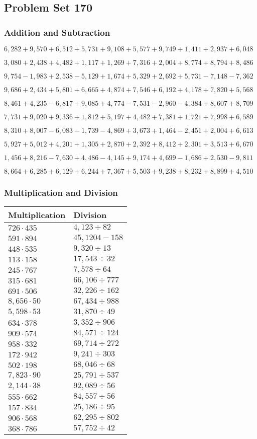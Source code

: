 \hypertarget{problem-set-170}{%
\subsection{Problem Set 170}\label{problem-set-170}}

\hypertarget{addition-and-subtraction}{%
\subsubsection{Addition and
Subtraction}\label{addition-and-subtraction}}

\(6,282+9,570+6,512+5,731+9,108+5,577+9,749+1,411+2,937+6,048\)

\(3,080+2,438+4,482+1,117+1,269+7,316+2,004+8,774+8,794+8,486\)

\(9,754-1,983+2,538-5,129+1,674+5,329+2,692+5,731-7,148-7,362\)

\(9,686+2,434+5,801+6,665+4,874+7,546+6,192+4,178+7,820+5,568\)

\(8,461+4,235-6,817+9,085+4,774-7,531-2,960-4,384+8,607+8,709\)

\(7,731+9,020+9,336+1,812+5,197+4,482+7,381+1,721+7,998+6,589\)

\(8,310+8,007-6,083-1,739-4,869+3,673+1,464-2,451+2,004+6,613\)

\(5,927+5,012+4,201+1,305+2,870+2,392+8,412+2,301+3,513+6,670\)

\(1,456+8,216-7,630+4,486-4,145+9,174+4,699-1,686+2,530-9,811\)

\(8,664+6,285+6,129+6,244+7,367+5,503+9,238+8,232+8,899+4,510\)

\hypertarget{multiplication-and-division}{%
\subsubsection{Multiplication and
Division}\label{multiplication-and-division}}

\begin{longtable}[]{@{}ll@{}}
\toprule
Multiplication & Division\tabularnewline
\midrule
\endhead
\(726\cdot435\) & \(4,123÷82\)\tabularnewline
\(591\cdot894\) & \(45,120 4-158\)\tabularnewline
\(448\cdot535\) & \(9,320÷13\)\tabularnewline
\(113\cdot158\) & \(17,543÷32\)\tabularnewline
\(245\cdot767\) & \(7,578÷64\)\tabularnewline
\(315\cdot681\) & \(66,106÷777\)\tabularnewline
\(691\cdot506\) & \(32,226÷162\)\tabularnewline
\(8,656\cdot50\) & \(67,434÷988\)\tabularnewline
\(5,598\cdot53\) & \(31,870÷49\)\tabularnewline
\(634\cdot378\) & \(3,352÷906\)\tabularnewline
\(909\cdot574\) & \(84,571÷124\)\tabularnewline
\(958\cdot332\) & \(69,714÷272\)\tabularnewline
\(172\cdot942\) & \(9,241÷303\)\tabularnewline
\(502\cdot198\) & \(68,046÷68\)\tabularnewline
\(7,823\cdot90\) & \(25,791÷537\)\tabularnewline
\(2,144\cdot38\) & \(92,089÷56\)\tabularnewline
\(555\cdot662\) & \(84,557÷56\)\tabularnewline
\(157\cdot834\) & \(25,186÷95\)\tabularnewline
\(906\cdot568\) & \(62,295÷802\)\tabularnewline
\(368\cdot786\) & \(57,752÷42\)\tabularnewline
\bottomrule
\end{longtable}
